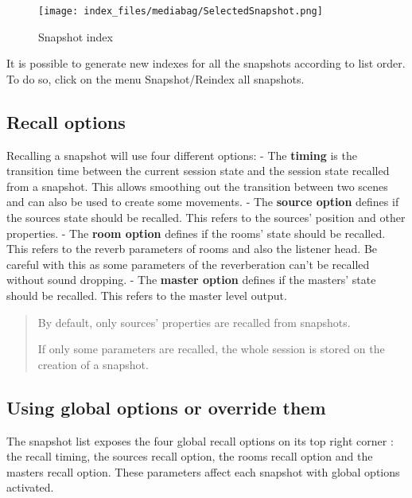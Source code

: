 \documentclass[
  letterpaper,
  DIV=11,
  numbers=noendperiod]{scrreport}
\begin{document}
\begin{figure}

{\centering \texttt{[image: index\_files/mediabag/SelectedSnapshot.png]}

}

\caption{Snapshot index}

\end{figure}

It is possible to generate new indexes for all the snapshots according
to list order. To do so, click on the menu Snapshot/Reindex all
snapshots.

\hypertarget{recall-options}{%
\subsection{Recall options}\label{recall-options}}

Recalling a snapshot will use four different options: - The
\textbf{timing} is the transition time between the current session state
and the session state recalled from a snapshot. This allows smoothing
out the transition between two scenes and can also be used to create
some movements. - The \textbf{source option} defines if the sources
state should be recalled. This refers to the sources' position and other
properties. - The \textbf{room option} defines if the rooms' state
should be recalled. This refers to the reverb parameters of rooms and
also the listener head. Be careful with this as some parameters of the
reverberation can't be recalled without sound dropping. - The
\textbf{master option} defines if the masters' state should be recalled.
This refers to the master level output.

\begin{quote}
By default, only sources' properties are recalled from snapshots.

If only some parameters are recalled, the whole session is stored on the
creation of a snapshot.
\end{quote}

\hypertarget{using-global-options-or-override-them}{%
\subsection{Using global options or override
them}\label{using-global-options-or-override-them}}

The snapshot list exposes the four global recall options on its top
right corner : the recall timing, the sources recall option, the rooms
recall option and the masters recall option. These parameters affect
each snapshot with global options activated.
\end{document}
